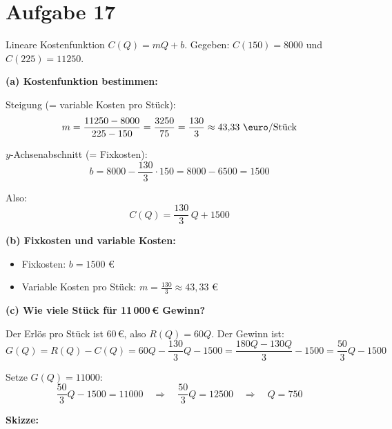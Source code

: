 \documentclass[12pt]{article}
\begin{document}
\section*{Aufgabe 17}

Lineare Kostenfunktion $C(Q) = mQ + b$. Gegeben: $C(150) = 8000$ und $C(225) = 11250$.

\textbf{(a) Kostenfunktion bestimmen:}

Steigung (= variable Kosten pro St\"uck):
\[
  m = \frac{11250 - 8000}{225 - 150} = \frac{3250}{75} = \frac{130}{3} \approx 43{,}33 \text{ \euro/St\"uck}
\]

$y$-Achsenabschnitt (= Fixkosten):
\[
  b = 8000 - \frac{130}{3} \cdot 150 = 8000 - 6500 = 1500
\]

Also:
\[
  \boxed{C(Q) = \frac{130}{3}\,Q + 1500}
\]

\textbf{(b) Fixkosten und variable Kosten:}
\begin{itemize}
  \item Fixkosten: $b = 1500$ \euro
  \item Variable Kosten pro St\"uck: $m = \frac{130}{3} \approx 43{,}33$ \euro
\end{itemize}

\textbf{(c) Wie viele St\"uck f\"ur 11\,000\,\euro{} Gewinn?}

Der Erl\"os pro St\"uck ist 60\,\euro, also $R(Q) = 60Q$. Der Gewinn ist:
\[
  G(Q) = R(Q) - C(Q) = 60Q - \frac{130}{3}Q - 1500 = \frac{180Q - 130Q}{3} - 1500 = \frac{50}{3}Q - 1500
\]

Setze $G(Q) = 11000$:
\[
  \frac{50}{3}Q - 1500 = 11000
  \quad\Longrightarrow\quad
  \frac{50}{3}Q = 12500
  \quad\Longrightarrow\quad
  \boxed{Q = 750}
\]

\textbf{Skizze:}

\begin{center}
\end{center}
\end{document}
